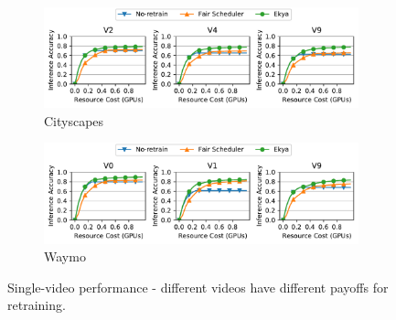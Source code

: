 
\begin{figure}
  \centering
  \begin{subfigure}[t]{\linewidth}
    \centering
    \includegraphics[width=\linewidth]{results/singlecam/singlecam_acc_vs_cost_golden_cityscapes.pdf} 
    \caption{\small Cityscapes}
    \label{fig:singlecam-cities-cityscapes-golden}
  \end{subfigure}
  \hfill
  \begin{subfigure}[t]{\linewidth}
    \centering
    \includegraphics[width=\linewidth]{results/singlecam/singlecam_acc_vs_cost_golden_waymo.pdf}
    \caption{\small Waymo}
    \label{fig:singlecam-cities-waymo-golden}
  \end{subfigure}
  \caption{Single-video performance - different videos have different payoffs for retraining.}%
  \label{fig:singlecam-cities}
\end{figure}


